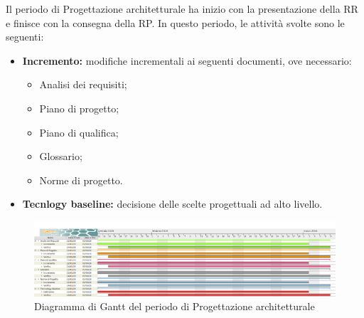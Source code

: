 Il periodo di Progettazione architetturale ha inizio con la presentazione della RR e finisce con la consegna della RP.\newline
In questo periodo, le attività svolte sono le seguenti:
\begin{itemize}
	\item \textbf{Incremento: }modifiche incrementali ai seguenti documenti, ove necessario:
	\begin{itemize}
		\item Analisi dei requisiti;
		\item Piano di progetto;
		\item Piano di qualifica;
		\item Glossario;
		\item Norme di progetto.
	\end{itemize}
	\item \textbf{Tecnlogy baseline: }decisione delle scelte progettuali ad alto livello.
\end{itemize}

\begin{figure}[H]
	\includegraphics[width=1\linewidth]{Pianificazione/Progettazione_Architetturale_Gantt.png}
	\caption{Diagramma di Gantt del periodo di Progettazione architetturale}
\end{figure}